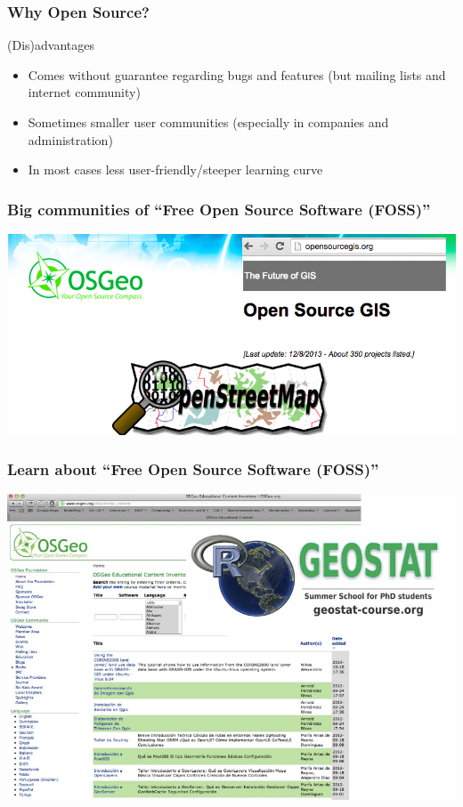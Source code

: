 \documentclass{beamer}
\begin{document}

\begin{frame}
\frametitle{Why Open Source?}
\begin{block}{(Dis)advantages}
\begin{itemize}
\item Comes without guarantee regarding bugs and features (but mailing lists and internet community) 
\item Sometimes smaller user communities (especially in companies and administration)
\item In most cases less user-friendly/steeper learning curve
\end{itemize}
\end{block}
\end{frame}


\begin{frame}
\frametitle{Big communities of ``Free Open Source Software (FOSS)''}
\centering
\includegraphics[width=\textwidth]{Figures/FOSS.png}
\end{frame}


\begin{frame}
\frametitle{Learn about ``Free Open Source Software (FOSS)''}
\centering
\includegraphics[width=\textwidth]{Figures/FOSS_ed.png}
\end{frame}
\end{document}
